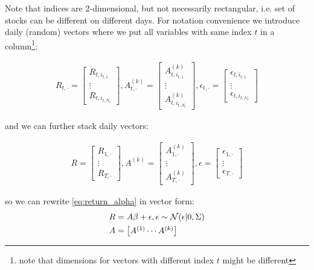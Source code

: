 Note that indices are 2-dimensional, but not necessarily rectangular, i.e. set of stocks can be different on different days. For notation convenience we introduce daily (random) vectors where we put all variables with same index $t$ in a column\footnote{note that dimensions for vectors with different index $t$ might be different}:

\begin{align}
	R_{t,\cdot} = \begin{bmatrix}R_{t,i_{t,1}} \\ \vdots \\  R_{t,i_{t, N_t}} \end{bmatrix},
	A^{(k)}_{t,\cdot} = \begin{bmatrix}A^{(k)}_{t,i_{t,1}} \\ \vdots \\  A^{(k)}_{t,i_{t, N_t}} \end{bmatrix},
	\epsilon_{t,\cdot} = \begin{bmatrix}\epsilon_{t,i_{t,1}} \\ \vdots \\  \epsilon_{t,i_{t, N_t}} \end{bmatrix}
\end{align}

and we can further stack daily vectors:

\begin{align}
	R = \begin{bmatrix}R_{1,\cdot} \\ \vdots \\  R_{T,\cdot}	\end{bmatrix},
	A^{(k)} = \begin{bmatrix}A^{(k)}_{1,\cdot} \\ \vdots \\  A^{(k)}_{T,\cdot}	\end{bmatrix},
	\epsilon = \begin{bmatrix}\epsilon_{1,\cdot} \\ \vdots \\  \epsilon_{T,\cdot}	\end{bmatrix}
\end{align}

so we can rewrite \autoref{eq:return_alpha} in vector form:
\begin{align}
	R &= A \beta + \epsilon, \epsilon \sim \mathcal{N}(\epsilon| 0, \Sigma) \\
	A &= \begin{bmatrix}
		A^{(1)} \cdots A^{(k)}
	\end{bmatrix}
\end{align}

